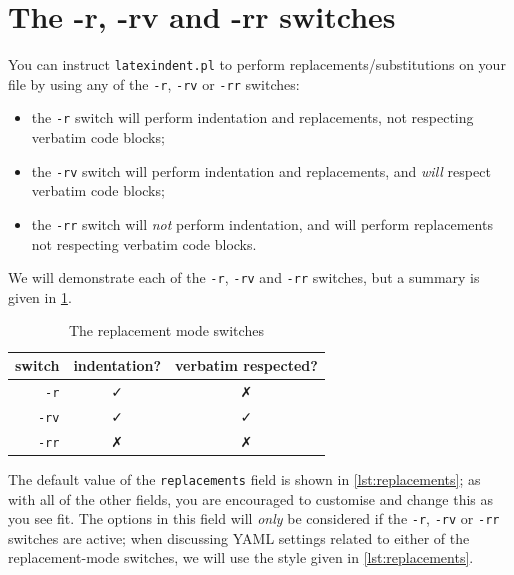 \section{The -r, -rv and -rr switches}\label{sec:replacements}

 You can instruct \texttt{latexindent.pl} to perform replacements/substitutions on your
 file by using any of the \texttt{-r}, \texttt{-rv}  or \texttt{-rr} switches: 
 \begin{itemize}
   \item the \texttt{-r} switch will perform indentation and replacements, not respecting verbatim code blocks;
   \item the \texttt{-rv} switch will perform indentation and replacements, and \emph{will} respect verbatim code blocks;
   \item the \texttt{-rr} switch will \emph{not} perform indentation,  and will perform replacements not respecting verbatim code blocks.
 \end{itemize}

 We will demonstrate each of the \texttt{-r}, \texttt{-rv}  and \texttt{-rr} switches, but a summary
 is given in \cref{tab:replacementswitches}.

 \begin{table}[!htb]
   \centering
   \caption{The replacement mode switches}\label{tab:replacementswitches}
   \begin{tabular}{rcc}
    \toprule
     switch & indentation? & verbatim respected?\\
     \midrule
     \texttt{-r} &\faCheck&\faClose\\
     \texttt{-rv} &\faCheck&\faCheck\\
     \texttt{-rr} &\faClose&\faClose\\
     \bottomrule
   \end{tabular}
 \end{table}

 The default value of the \texttt{replacements} field is shown in
 \cref{lst:replacements}; as with all of the other fields, you are encouraged to customise
 and change this as you see fit. The options in this field will \emph{only} be
 considered if the \texttt{-r}, \texttt{-rv}  or \texttt{-rr} switches are
 active; when discussing YAML settings related to either of the replacement-mode switches,
 we will use the style given in \cref{lst:replacements}.

